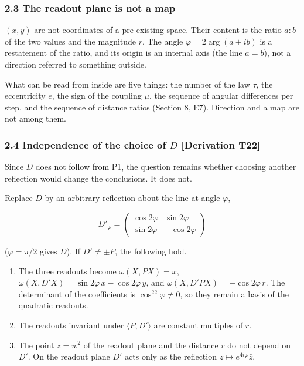 \documentclass[
  a4paper,
]{article}
\providecommand{\tightlist}{%
  \setlength{\itemsep}{0pt}\setlength{\parskip}{0pt}}
\begin{document}
\subsubsection{2.3 The readout plane is not a
map}\label{the-readout-plane-is-not-a-map}

\((x,y)\) are not coordinates of a pre-existing space. Their content is
the ratio \(a:b\) of the two values and the magnitude \(r\). The angle
\(\varphi=2\arg(a+ib)\) is a restatement of the ratio, and its origin is
an internal axis (the line \(a=b\)), not a direction referred to
something outside.

What can be read from inside are five things: the number of the law
\(\tau\), the eccentricity \(e\), the sign of the coupling \(\mu\), the
sequence of angular differences per step, and the sequence of distance
ratios (Section 8, E7). Direction and a map are not among them.

\subsubsection{\texorpdfstring{2.4 Independence of the choice of \(D\)
{[}Derivation
T22{]}}{2.4 Independence of the choice of D {[}Derivation T22{]}}}\label{independence-of-the-choice-of-d-derivation-t22}

Since \(D\) does not follow from P1, the question remains whether
choosing another reflection would change the conclusions. It does not.

Replace \(D\) by an arbitrary reflection about the line at angle
\(\varphi\),

\[
D'_\varphi=\begin{pmatrix}\cos2\varphi&\sin2\varphi\\\sin2\varphi&-\cos2\varphi\end{pmatrix}
\]

(\(\varphi=\pi/2\) gives \(D\)). If \(D'\neq\pm P\), the following hold.

\begin{enumerate}
\def\labelenumi{\arabic{enumi}.}
\tightlist
\item
  The three readouts become \(\omega(X,PX)=x\),
  \(\omega(X,D'X)=\sin2\varphi\,x-\cos2\varphi\,y\), and
  \(\omega(X,D'PX)=-\cos2\varphi\,r\). The determinant of the
  coefficients is \(\cos^22\varphi\neq0\), so they remain a basis of the
  quadratic readouts.
\item
  The readouts invariant under \(\langle P,D'\rangle\) are constant
  multiples of \(r\).
\item
  The point \(z=w^2\) of the readout plane and the distance \(r\) do not
  depend on \(D'\). On the readout plane \(D'\) acts only as the
  reflection \(z\mapsto e^{4i\varphi}\bar z\).
\end{enumerate}
\end{document}
